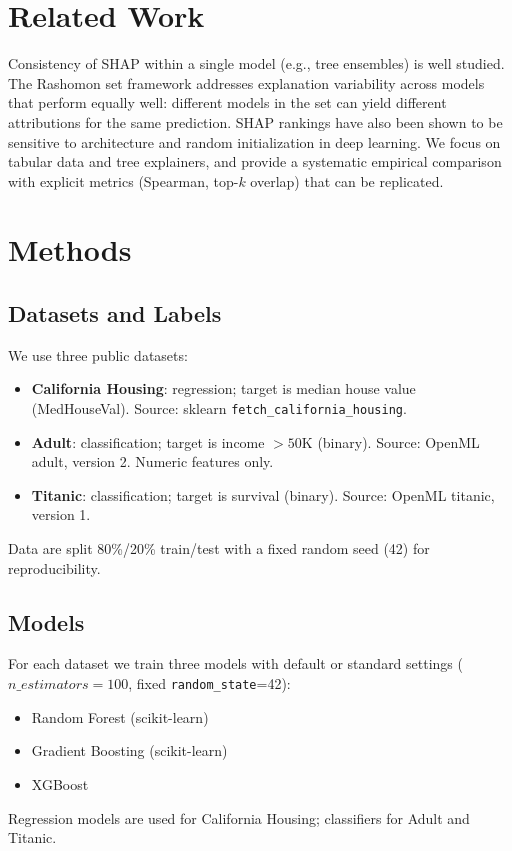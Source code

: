 \documentclass[11pt,a4paper]{article}
\begin{document}
\section{Related Work}
\label{sec:related}

Consistency of SHAP within a single model (e.g., tree ensembles) is well studied. The Rashomon set framework addresses explanation variability across models that perform equally well: different models in the set can yield different attributions for the same prediction. SHAP rankings have also been shown to be sensitive to architecture and random initialization in deep learning. We focus on tabular data and tree explainers, and provide a systematic empirical comparison with explicit metrics (Spearman, top-$k$ overlap) that can be replicated.

\section{Methods}
\label{sec:methods}

\subsection{Datasets and Labels}
We use three public datasets:
\begin{itemize}
  \item \textbf{California Housing}: regression; target is median house value (MedHouseVal). Source: sklearn \texttt{fetch\_california\_housing}.
  \item \textbf{Adult}: classification; target is income $>50$K (binary). Source: OpenML adult, version 2. Numeric features only.
  \item \textbf{Titanic}: classification; target is survival (binary). Source: OpenML titanic, version 1.
\end{itemize}
Data are split 80\%/20\% train/test with a fixed random seed (42) for reproducibility.

\subsection{Models}
For each dataset we train three models with default or standard settings ($n\_estimators=100$, fixed \texttt{random\_state}=42):
\begin{itemize}
  \item Random Forest (scikit-learn)
  \item Gradient Boosting (scikit-learn)
  \item XGBoost
\end{itemize}
Regression models are used for California Housing; classifiers for Adult and Titanic.
\end{document}
